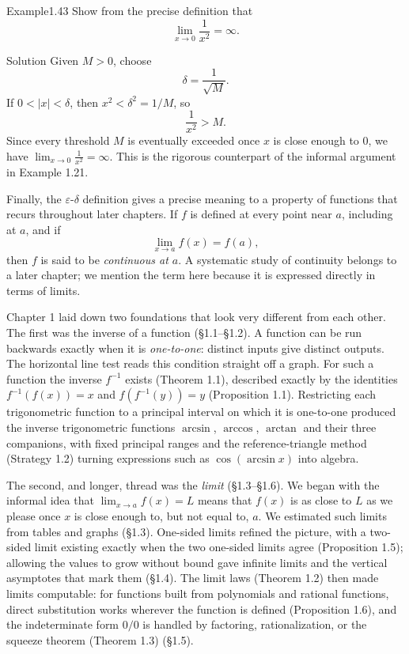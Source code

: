 \documentclass[a4paper,12pt,oneside]{memoir}
\begin{document}
\begin{workedexample}
\begin{envexample}{Example}{1.43}{}
Show from the precise definition that \[ \lim_{x \to 0} \frac{1}{x^{2}} = \infty. \]
\end{envexample}
\begin{envsolution}{Solution}{}{}
Given \(M > 0\), choose \[ \delta = \frac{1}{\sqrt{M}}. \] If \(0 < |x| < \delta\), then \(x^{2} < \delta^{2} = 1/M\), so \[ \frac{1}{x^{2}} > M. \] Since every threshold \(M\) is eventually exceeded once \(x\) is close enough to \(0\), we have \(\lim_{x \to 0} \frac{1}{x^{2}} = \infty\). This is the rigorous counterpart of the informal argument in Example 1.21.
\end{envsolution}
\end{workedexample}
Finally, the \(\varepsilon\)-\(\delta\) definition gives a precise meaning to a property of functions that recurs throughout later chapters. If \(f\) is defined at every point near \(a\), including at \(a\), and if \[ \lim_{x \to a} f(x) = f(a), \] then \(f\) is said to be \emph{continuous at \(a\)}. A systematic study of continuity belongs to a later chapter; we mention the term here because it is expressed directly in terms of limits.

Chapter 1 laid down two foundations that look very different from each other. The first was the inverse of a function (§1.1–§1.2). A function can be run backwards exactly when it is \emph{one-to-one}: distinct inputs give distinct outputs. The horizontal line test reads this condition straight off a graph. For such a function the inverse \(f^{-1}\) exists (Theorem 1.1), described exactly by the identities \(f^{-1}(f(x)) = x\) and \(f(f^{-1}(y)) = y\) (Proposition 1.1). Restricting each trigonometric function to a principal interval on which it is one-to-one produced the inverse trigonometric functions \(\arcsin\), \(\arccos\), \(\arctan\) and their three companions, with fixed principal ranges and the reference-triangle method (Strategy 1.2) turning expressions such as \(\cos(\arcsin x)\) into algebra.

The second, and longer, thread was the \emph{limit} (§1.3–§1.6). We began with the informal idea that \(\lim_{x \to a} f(x) = L\) means that \(f(x)\) is as close to \(L\) as we please once \(x\) is close enough to, but not equal to, \(a\). We estimated such limits from tables and graphs (§1.3). One-sided limits refined the picture, with a two-sided limit existing exactly when the two one-sided limits agree (Proposition 1.5); allowing the values to grow without bound gave infinite limits and the vertical asymptotes that mark them (§1.4). The limit laws (Theorem 1.2) then made limits computable: for functions built from polynomials and rational functions, direct substitution works wherever the function is defined (Proposition 1.6), and the indeterminate form \(0/0\) is handled by factoring, rationalization, or the squeeze theorem (Theorem 1.3) (§1.5).
\end{document}
